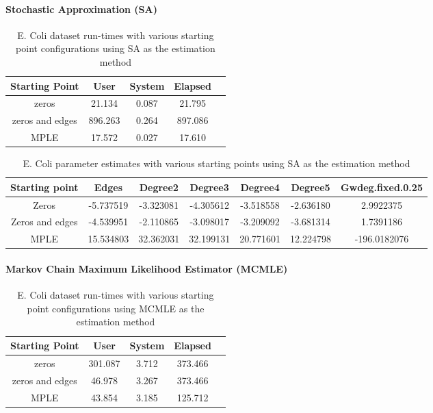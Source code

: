 \paragraph{Stochastic Approximation (SA)}

\begin{table}[H]
\centering
\begin{tabular}{||c | c | c | c | c||}
 \hline
 Starting Point & User & System & Elapsed \\ 
 \hline
 zeros & 21.134 & 0.087 & 21.795 \\
 \hline
 zeros and edges & 896.263 & 0.264 & 897.086 \\ 
 \hline
 MPLE & 17.572 & 0.027 & 17.610 \\
 \hline
 \end{tabular}
 \label{t:ecoli1_sa}
 \caption{E. Coli dataset run-times with various starting point configurations using SA as the estimation method}
 \end{table}

\begin{table}[H]
\centering
\scriptsize
\begin{tabular}{|| c | c | c | c | c | c | c ||}
\hline
Starting point & Edges & Degree2 & Degree3 & Degree4 & Degree5 & Gwdeg.fixed.0.25 \\
\hline
Zeros & -5.737519 & -3.323081 & -4.305612 & -3.518558 & -2.636180 & 2.9922375 \\
\hline
Zeros and edges & -4.539951 &-2.110865 & -3.098017 & -3.209092 & -3.681314 & 1.7391186 \\
\hline
MPLE & 15.534803 & 32.362031 & 32.199131 & 20.771601 & 12.224798 & -196.0182076 \\
\hline
\end{tabular}
\label{t:params_ecoli_sa}
\caption{E. Coli parameter estimates with various starting points using SA as the estimation method}
\end{table}

\paragraph{Markov Chain Maximum Likelihood Estimator (MCMLE)}

\begin{table}[H]
\centering
 \begin{tabular}{||c | c | c | c | c||} 
 \hline
 Starting Point & User & System & Elapsed \\ 
 \hline
 zeros & 301.087 & 3.712 & 373.466 \\
 \hline
 zeros and edges & 46.978 & 3.267 & 373.466 \\ 
 \hline
 MPLE & 43.854 & 3.185 & 125.712 \\ 
 \hline
\end{tabular}
\label{t:ecoli1_mcmle}
\caption{E. Coli dataset run-times with various starting point configurations using MCMLE as the estimation method}
\end{table}

